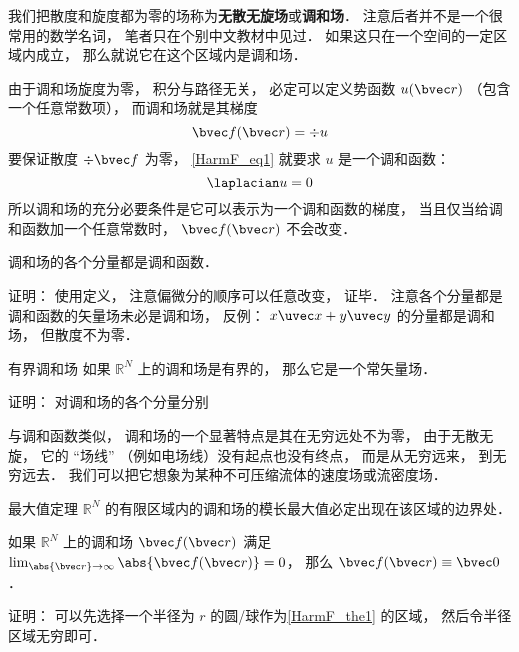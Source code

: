 
\begin{issues}
\issueDraft
\end{issues}


我们把散度和旋度都为零的场称为\textbf{无散无旋场}或\textbf{调和场}． 注意后者并不是一个很常用的数学名词， 笔者只在个别中文教材中见过． 如果这只在一个空间的一定区域内成立， 那么就说它在这个区域内是调和场．

由于调和场旋度为零， 积分与路径无关， 必定可以定义势函数 $u(\bvec r)$ （包含一个任意常数项）， 而调和场就是其梯度
\begin{equation}\label{HarmF_eq1}
\bvec f(\bvec r) = \div u
\end{equation}
要保证散度 $\div \bvec f$ 为零， \autoref{HarmF_eq1} 就要求 $u$ 是一个调和函数：
\begin{equation}
\laplacian u = 0
\end{equation}
所以调和场的充分必要条件是它可以表示为一个调和函数的梯度， 当且仅当给调和函数加一个任意常数时， $\bvec f(\bvec r)$ 不会改变．

\begin{theorem}{}
调和场的各个分量都是调和函数．
\end{theorem}
证明： 使用定义， 注意偏微分的顺序可以任意改变， 证毕． 注意各个分量都是调和函数的矢量场未必是调和场， 反例： $x\uvec x + y \uvec y$ 的分量都是调和场， 但散度不为零．

\begin{corollary}{有界调和场}
如果 $\mathbb R^N$ 上的调和场是有界的， 那么它是一个常矢量场．
\end{corollary}
证明： 对调和场的各个分量分别

与调和函数类似， 调和场的一个显著特点是其在无穷远处不为零， 由于无散无旋， 它的 “场线” （例如电场线）没有起点也没有终点， 而是从无穷远来， 到无穷远去． 我们可以把它想象为某种不可压缩流体的速度场或流密度场．

\begin{theorem}{最大值定理}\label{HarmF_the1}
$\mathbb R^N$ 的有限区域内的调和场的模长最大值必定出现在该区域的边界处．
\end{theorem}

\begin{corollary}{}
如果 $\mathbb R^N$ 上的调和场 $\bvec f(\bvec r)$ 满足 $\lim_{\abs{\bvec r}\to \infty} \abs{\bvec f(\bvec r)}  = 0$， 那么 $\bvec f(\bvec r) \equiv \bvec 0$．
\end{corollary}
证明： 可以先选择一个半径为 $r$ 的圆/球作为\autoref{HarmF_the1} 的区域， 然后令半径区域无穷即可．
